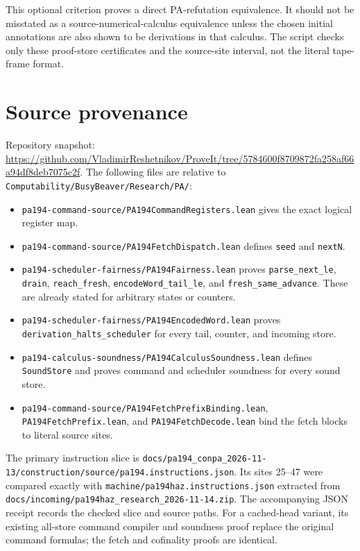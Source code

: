 \documentclass[11pt]{article}
\begin{document}
This optional criterion proves a direct PA-refutation equivalence. It
should not be misstated as a source-numerical-calculus equivalence unless
the chosen initial annotations are also shown to be derivations in that
calculus. The script checks only these proof-store certificates and the
source-site interval, not the literal tape-frame format.

\section{Source provenance}

Repository snapshot:
\url{https://github.com/VladimirReshetnikov/ProveIt/tree/5784600f8709872fa258af66a94df8deb7075c2f}.
The following files are relative to
\texttt{Computability/BusyBeaver/Research/PA/}:
\begin{itemize}
\item \texttt{pa194-command-source/PA194CommandRegisters.lean} gives the
      exact logical register map.
\item \texttt{pa194-command-source/PA194FetchDispatch.lean} defines
      \texttt{seed} and \texttt{nextN}.
\item \texttt{pa194-scheduler-fairness/PA194Fairness.lean} proves
      \texttt{parse\_next\_le}, \texttt{drain}, \texttt{reach\_fresh},
      \texttt{encodeWord\_tail\_le}, and \texttt{fresh\_same\_advance}.
      These are already stated for arbitrary states or counters.
\item \texttt{pa194-scheduler-fairness/PA194EncodedWord.lean} proves
      \texttt{derivation\_halts\_scheduler} for every tail, counter,
      and incoming store.
\item \texttt{pa194-calculus-soundness/PA194CalculusSoundness.lean}
      defines \texttt{SoundStore} and proves command and scheduler
      soundness for every sound store.
\item \texttt{pa194-command-source/PA194FetchPrefixBinding.lean},
      \texttt{PA194FetchPrefix.lean}, and \texttt{PA194FetchDecode.lean}
      bind the fetch blocks to literal source sites.
\end{itemize}

The primary instruction slice is
\texttt{docs/pa194\_conpa\_2026-11-13/construction/source/pa194.instructions.json}.
Its sites 25--47 were compared exactly with
\texttt{machine/pa194haz.instructions.json} extracted from
\texttt{docs/incoming/pa194haz\_research\_2026-11-14.zip}.
The accompanying JSON receipt records the checked slice and source paths.
For a cached-head variant, its existing all-store command compiler and
soundness proof replace the original command formulas; the fetch and
cofinality proofs are identical.
\end{document}
